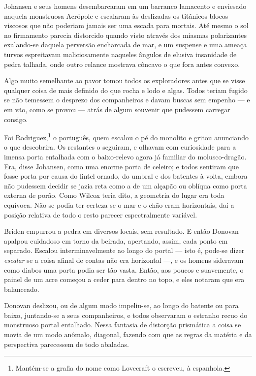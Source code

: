 Johansen e seus homens desembarcaram em um barranco lamacento e
enviesado naquela monstruosa Acrópole e escalaram às deslizadas os
titânicos blocos viscosos que não poderiam jamais ser uma escada para
mortais. Até mesmo o sol no firmamento parecia distorcido quando visto
através dos miasmas polarizantes exalando-se daquela perversão
encharcada de mar, e um suspense e uma ameaça turvos espreitavam
maliciosamente naqueles ângulos de elusiva insanidade de pedra talhada,
onde outro relance mostrava côncavo o que fora antes convexo.

Algo muito semelhante ao pavor tomou todos os exploradores antes que se
visse qualquer coisa de mais definido do que rocha e lodo e algas. Todos
teriam fugido se não temessem o desprezo dos companheiros e davam
buscas sem empenho --- e em vão, como se provou --- atrás de algum souvenir que pudessem carregar consigo.

Foi Rodriguez,\footnote{Mantém-se a grafia do nome como Lovecraft o
  escreveu, à espanhola.} o português, quem escalou o pé do monolito e
gritou anunciando o que descobrira. Os restantes o seguiram, e olhavam
com curiosidade para a imensa porta entalhada com o baixo-relevo agora
já familiar do molusco-dragão. Era, disse Johansen, como uma enorme
porta de celeiro; e todos sentiram que fosse porta por causa do lintel
ornado, do umbral e dos batentes à volta, embora não pudessem decidir se
jazia reta como a de um alçapão ou oblíqua como porta externa de porão.
Como Wilcox teria dito, a geometria do lugar era toda equívoca. Não se
podia ter certeza se o mar e o chão eram horizontais, daí a posição
relativa de todo o resto parecer espectralmente variável.

Briden empurrou a pedra em diversos locais, sem resultado. E então
Donovan apalpou cuidadoso em torno da beirada, apertando, assim, cada
ponto em separado. Escalou interminavelmente ao longo do portal --- isto
é, pode-se dizer \emph{escalar} se a coisa afinal de contas não era
horizontal ---, e os homens sideravam como diabos uma porta podia
ser tão vasta. Então, aos poucos e suavemente, o painel de um acre
começou a ceder para dentro no topo, e eles notaram que era balanceado.

Donovan deslizou, ou de algum modo impeliu-se, ao longo do batente ou
para baixo, juntando-se a seus companheiros, e todos observaram o
estranho recuo do monstruoso portal entalhado. Nessa fantasia de
distorção prismática a coisa se movia de um modo anômalo, diagonal,
fazendo com que as regras da matéria e da perspectiva parecessem de todo
abaladas.

